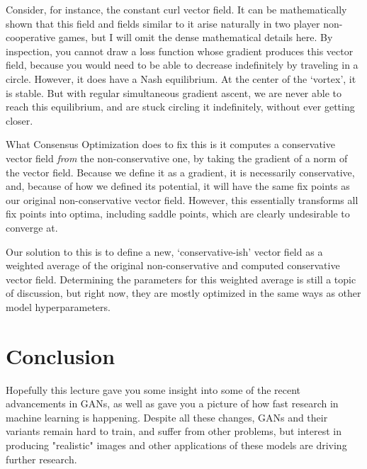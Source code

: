 \documentclass{article}
\begin{document}
Consider, for instance, the constant curl vector field. It can be mathematically shown that this field and fields similar to it arise naturally in two player non-cooperative games, but I will omit the dense mathematical details here. By inspection, you cannot draw a loss function whose gradient produces this vector field, because you would need to be able to decrease indefinitely by traveling in a circle. However, it does have a Nash equilibrium. At the center of the `vortex', it is stable. But with regular simultaneous gradient ascent, we are never able to reach this equilibrium, and are stuck circling it indefinitely, without ever getting closer.

What Consensus Optimization does to fix this is it computes a conservative vector field \textit{from} the non-conservative one, by taking the gradient of a norm of the vector field. Because we define it as a gradient, it is necessarily conservative, and, because of how we defined its potential, it will have the same fix points as our original non-conservative vector field. However, this essentially transforms all fix points into optima, including saddle points, which are clearly undesirable to converge at.

Our solution to this is to define a new, `conservative-ish' vector field as a weighted average of the original non-conservative and computed conservative vector field. Determining the parameters for this weighted average is still a topic of discussion, but right now, they are mostly optimized in the same ways as other model hyperparameters.

\vspace{0.3in}

\section{Conclusion}
Hopefully this lecture gave you some insight into some of the recent advancements in GANs, as well as gave you a picture of how fast research in machine learning is happening. Despite all these changes, GANs and their variants remain hard to train, and suffer from other problems, but interest in producing "realistic" images and other applications of these models are driving further research.
\end{document}
